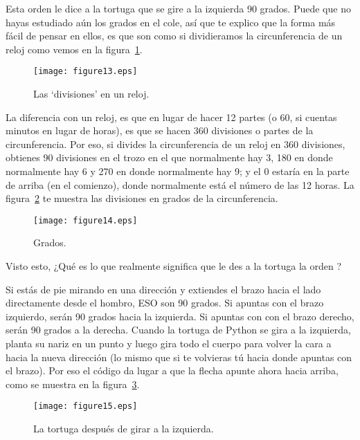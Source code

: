 Esta orden le dice a la tortuga que se gire a la izquierda 90 grados.  Puede que no hayas estudiado aún los grados en el cole, así que te explico que la forma más fácil de pensar en ellos, es que son como si dividieramos la circunferencia de un reloj como vemos en la figura~\ref{fig13}.

\begin{figure}
\begin{center}
\texttt{[image: figure13.eps]}
\end{center}
\caption{Las `divisiones' en un reloj.}\label{fig13}
\end{figure}

La diferencia con un reloj, es que en lugar de hacer 12 partes (o 60, si cuentas minutos en lugar de horas), es que se hacen 360 divisiones o partes de la circunferencia. Por eso, si divides la circunferencia de un reloj en 360 divisiones, obtienes 90 divisiones en el trozo en el que normalmente hay 3, 180 en donde normalmente hay 6 y 270 en donde normalmente hay 9; y el 0 estaría en la parte de arriba (en el comienzo), donde normalmente está el número de las 12 horas.  La figura~\ref{fig14} te muestra las divisiones en grados de la circunferencia.

\begin{figure}
\begin{center}
\texttt{[image: figure14.eps]}
\end{center}
\caption{Grados.}\label{fig14}
\end{figure}

Visto esto, ¿Qué es lo que realmente significa que le des a la tortuga la orden ?
\par
Si estás de pie mirando en una dirección y extiendes el brazo hacia el lado directamente desde el hombro, ESO son 90 grados. Si apuntas con el brazo izquierdo, serán 90 grados hacia la izquierda. Si apuntas con con el brazo derecho, serán 90 grados a la derecha. Cuando la tortuga de Python se gira a la izquierda, planta su nariz en un punto y luego gira todo el cuerpo para volver la cara a hacia la nueva dirección (lo mismo que si te volvieras tú hacia donde apuntas con el brazo). Por eso el código  da lugar a que la flecha apunte ahora hacia arriba, como se muestra en la figura~\ref{fig15}.

\begin{figure}
\begin{center}
\texttt{[image: figure15.eps]}
\end{center}
\caption{La tortuga después de girar a la izquierda.}\label{fig15}
\end{figure}

